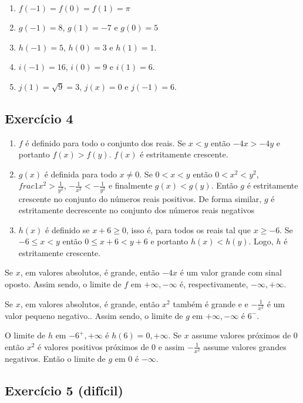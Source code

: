 \begin{enumerate}
  \item $f(-1) = f(0) = f(1) = \pi$
  \item $g(-1) = 8$, $g(1) = -7$ e $g(0) = 5$
  \item $h(-1) = 5$, $h(0) = 3$ e $h(1) = 1$.
  \item $i(-1) = 16$, $i(0) = 9$ e $i(1) = 6$.
  \item $j(1) = \sqrt{9} = 3$, $j(x) = 0$ e $j(-1) = 6$.
\end{enumerate}

\subsection*{Exercício 4}

\begin{enumerate}
  \item $f$ é definido para todo o conjunto dos reais.
    Se $x < y$ então $-4 x > -4 y$ e portanto $f(x) > f(y)$.
    $f(x)$ é estritamente crescente.
  \item $g(x)$ é definida para todo $x \neq 0$.
    Se $0 < x < y$ então $0 < x^2 < y^2$,
    $frac{1}{x^2} > \frac{1}{y^2}$,
    $-\frac{1}{x^2} < -\frac{1}{y^2}$
    e finalmente $g(x) < g(y)$.
    Então $g$ é estritamente crescente no conjunto do números reais positivos.
    De forma similar, $g$ é estritamente decrescente no conjunto dos números
    reais negativos
  \item $h(x)$ é definido se $x+6 \geq 0$,
    isso é,
    para todos os reais tal que $x \geq -6$.
    Se $-6 \leq x < y$ então $0 \leq x + 6 < y + 6$
    e portanto $h(x) < h(y)$.
    Logo, $h$ é estritamente crescente.
\end{enumerate}

Se $x$, em valores absolutos, é grande,
então $-4x$ é um valor grande com sinal oposto.
Assim sendo, o limite de $f$ em $+\infty, -\infty$ é, respectivamente, $-\infty, +\infty$.

Se $x$, em valores absolutos, é grande,
então $x^2$ também é grande e
e $-\frac{1}{x^2}$ é um valor pequeno negativo..
Assim sendo, o limite de $g$ em $+\infty, -\infty$ é $6^{-}$.

O limite de $h$ em ${-6}^+, +\infty$ é $h(6) = 0, +\infty$.
Se $x$ assume valores próximos de $0$ então $x^2$ é valores positivos próximos
de $0$ e assim $-\frac{1}{x^2}$ assume valores grandes negativos.
Então o limite de $g$ em $0$ é $-\infty$.

\subsection*{Exercício 5 (difícil)}

